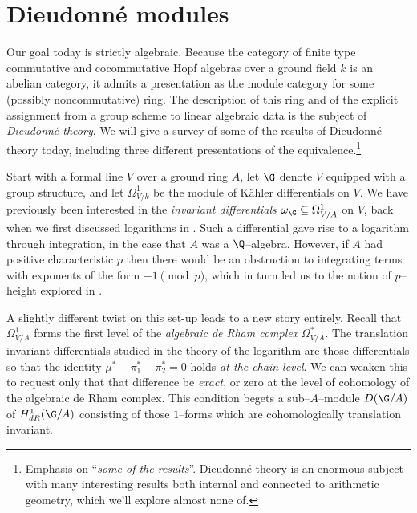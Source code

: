 \section{Dieudonn\'e modules}\label{SectionDieudonneModules}

Our goal today is strictly algebraic.  Because the category of finite type commutative and cocommutative Hopf algebras over a ground field $k$ is an abelian category, it admits a presentation as the module category for some (possibly noncommutative) ring.  The description of this ring and of the explicit assignment from a group scheme to linear algebraic data is the subject of \textit{Dieudonn\'e theory}.  We will give a survey of some of the results of Dieudonn\'e theory today, including three different presentations of the equivalence.\footnote{Emphasis on ``\emph{some of the results}''.  Dieudonn\'e theory is an enormous subject with many interesting results both internal and connected to arithmetic geometry, which we'll explore almost none of.}

Start with a formal line $V$ over a ground ring $A$, let $\G$ denote $V$ equipped with a group structure, and let $\Omega^1_{V/k}$ be the module of K\"ahler differentials on $V$.  We have previously been interested in the \textit{invariant differentials} $\omega_{\G} \subseteq \Omega^1_{V/A}$ on $V$, back when we first discussed logarithms in .  Such a differential gave rise to a logarithm through integration, in the case that $A$ was a $\Q$--algebra.  However, if $A$ had positive characteristic $p$ then there would be an obstruction to integrating terms with exponents of the form $-1 \pmod p$, which in turn led us to the notion of $p$--height explored in .

A slightly different twist on this set-up leads to a new story entirely.  Recall that $\Omega^1_{V/A}$ forms the first level of the \textit{algebraic de Rham complex} $\Omega^*_{V/A}$.  The translation invariant differentials studied in the theory of the logarithm are those differentials so that the identity $\mu^* - \pi_1^* - \pi_2^* = 0$  holds \emph{at the chain level}.  We can weaken this to request only that that difference be \emph{exact}, or zero at the level of cohomology of the algebraic de Rham complex.  This condition begets a sub--$A$--module $D(\G/A)$ of $H^1_{dR}(\G/A)$ consisting of those $1$--forms which are cohomologically translation invariant.

